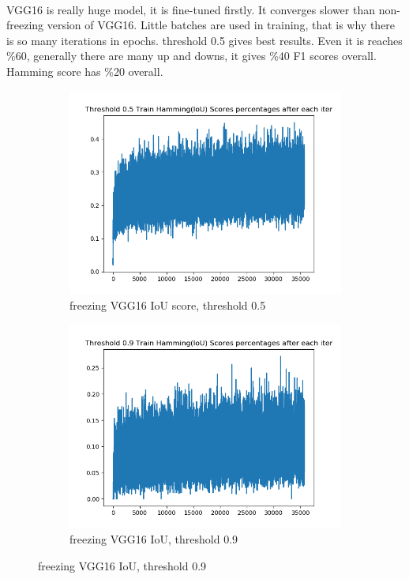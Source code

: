 \paragraph{}VGG16 is really huge model, it is fine-tuned firstly. It converges slower than non-freezing version of VGG16. Little batches are used in training, that is why there is so many iterations in epochs. threshold 0.5 gives best results. Even it is reaches \%60, generally there are many up and downs, it gives \%40 F1 scores overall. Hamming score has \%20 overall.   

\begin{figure}[!ht]
\centering
\begin{subfigure}{.5\textwidth}
	\centering
	\includegraphics[width=1\linewidth]{vgg16-0_26-lazy-1-train-scores-hs-5.png}
	\caption{\label{vgg16:vgg16-0_26-lazy-1-train-scores-hs-5}freezing VGG16 IoU score, threshold 0.5}
\end{subfigure}%
\begin{subfigure}{.5\textwidth}
	\centering
	\includegraphics[width=1\linewidth]{vgg16-0_26-lazy-1-train-scores-hs-9.png}
	\caption{\label{vgg16:vgg16-0_26-lazy-1-train-scores-hs-9}freezing VGG16 IoU, threshold 0.9}
\end{subfigure}
\end{figure}

